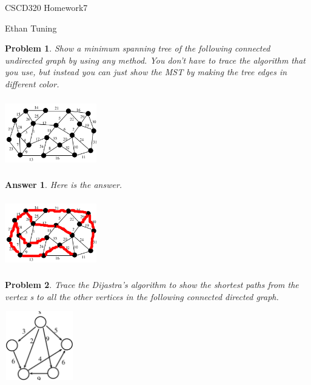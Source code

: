 \documentclass[11pt]{article}
\newtheorem{problem}{Problem}
\newtheorem{answer}{Answer}
\begin{document}
\begin{center}
	{\LARGE CSCD320 Homework7}
	
	\bigskip
	
	{\Large Ethan Tuning}
\end{center}

\bigskip

\begin{problem}
 \label{prob:1}
 Show a minimum spanning tree of the following connected undirected graph by using any method. You don't have to trace the algorithm that you use, but instead you can just show the MST by making the tree edges in different color.
\begin{center}
\includegraphics[width=4cm, height=3cm]{graph1}
\end{center}
\end{problem}

\begin{answer}
 \label{ans:1}
 Here is the answer.
\begin{center}
\includegraphics[width=4cm, height=3cm]{graph2}
\end{center}
\end{answer}

\bigskip

\begin{problem}
 \label{prob:2}
 Trace the Dijastra's algorithm to show the shortest paths from the vertex s to all the other vertices in the following connected directed graph.
\begin{center}
\includegraphics[width=3cm, height=3cm]{graph3}
\end{center}
\end{problem}
\end{document}

